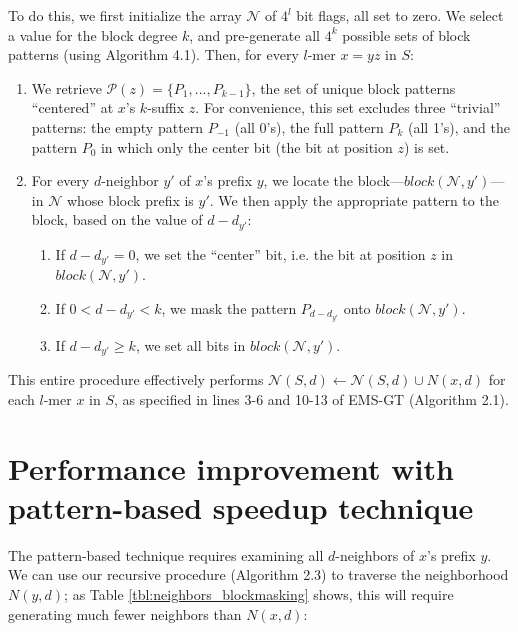 \documentclass[oneside,12pt]{DISCSthesis}
\begin{document}
{		To do this, we first initialize the array $\mathcal{N}$ of $4^l$ bit flags, all set to zero. We select a value for the block degree $k$, and pre-generate all $4^k$ possible sets of block patterns (using Algorithm 4.1). Then, for every $l$-mer $x = yz$ in $S$:
		\begin{enumerate}
			\item We retrieve $\mathcal{P}(z) = \{P_{1}, ... , P_{k-1}\}$, the set of unique block patterns ``centered'' at $x$'s $k$-suffix $z$. For convenience, this set excludes three ``trivial'' patterns: the empty pattern $P_{-1}$ (all 0's), the full pattern $P_{k}$ (all 1's), and the pattern $P_{0}$ in which only the center bit (the bit at position $z$) is set.
			\item For every $d$-neighbor $y'$ of $x$'s prefix $y$, we locate the block---$block(\mathcal{N}, y')$---in $\mathcal{N}$ whose block prefix is $y'$. We then apply the appropriate pattern to the block, based on the value of $d - d_{y'}$:
			\begin{enumerate}
				\item If $d - d_{y'} = 0$, we set the ``center'' bit, i.e. the bit at position $z$ in $block(\mathcal{N}, y')$.
				\item If $0 < d - d_{y'} < k$, we mask the pattern $P_{d - d_{y'}}$ onto $block(\mathcal{N}, y')$.
				\item If $d - d_{y'} \geq k$, we set all bits in $block(\mathcal{N}, y')$.
			\end{enumerate}
		\end{enumerate}

		\noindent This entire procedure effectively performs $\mathcal{N}(S,d) \leftarrow \mathcal{N}(S,d) \cup N(x,d)$ for each $l$-mer $x$ in $S$, as specified in lines 3-6 and 10-13 of EMS-GT (Algorithm 2.1).

	\section{Performance improvement with pattern-based speedup technique}
		The pattern-based technique requires examining all $d$-neighbors of $x$'s prefix $y$.
		We can use our recursive procedure (Algorithm 2.3) to traverse the neighborhood $N(y,d)$; as Table \ref{tbl:neighbors_blockmasking} shows, this will require generating much fewer neighbors than $N(x,d)$:\newline

}
\end{document}
